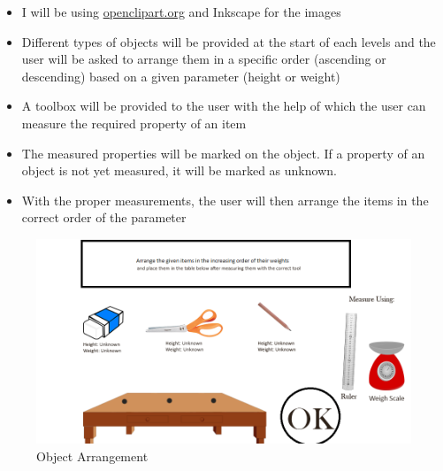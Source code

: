\documentclass[preprint,12pt]{elsarticle}
\begin{document}
\begin{itemize}

\item I will be using \href{https://openclipart.org/}{openclipart.org} and Inkscape for the images

\item Different types of objects will be provided at the start of each levels and the user will be asked to arrange them in a specific order (ascending or descending) based on a given parameter (height or weight)

\item A toolbox will be provided to the user with the help of which the user can measure the required property of an item

\item The measured properties will be marked on the object. If a property of an object is not yet measured, it will be marked as unknown.

\item With the proper measurements, the user will then arrange the items in the correct order of the parameter

\end{itemize}

\begin{figure}[H]
\centering\includegraphics[width=1.0\linewidth]{arrangement}
\caption{Object Arrangement}
\end{figure}




\end{document}
